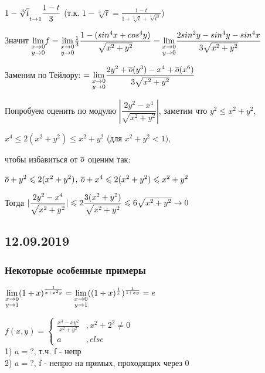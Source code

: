 \documentclass[12pt, fleqn]{article}
\begin{document}
\begin{sol}
    $1-\sqrt[3]{t} \underset{t \rightarrow 1}{~} \dfrac{1-t}{3}$ (т.к. $1-\sqrt[3]{t}=\frac{1-t}{1+\sqrt[5]{t}+\sqrt[3]{t^2}}$)
    
    Значит $\underset{y \rightarrow 0}{\lim\limits_{x \rightarrow 0}} f = \underset{y \rightarrow 0}{\lim\limits_{x \rightarrow 0}} \frac{1}{3} \dfrac{1-(sin^4 x + cos^4 y)}{\sqrt{x^2+y^2}} = \underset{y \rightarrow 0}{\lim\limits_{x \rightarrow 0}} \dfrac{2sin^2 y - sin^4 y - sin^4 x}{3 \sqrt{x^2+y^2}}$
    
    Заменим по Тейлору: $=\underset{y \rightarrow 0}{\lim\limits_{x \rightarrow 0}} \dfrac{2y^2 + \overline{o}(y^3)-x^4 + \overline{o}(x^6)}{3 \sqrt{x^2+y^2}}$
    
    Попробуем оценить по модулю $|\dfrac{2y^2-x^4}{\sqrt{x^2+y^2}}|$, заметим что $y^2 \leqslant x^2 + y^2$, 
    
    $x^4 \leqslant 2(x^2+y^2) \leqslant x^2+y^2$ (для $x^2+y^2 < 1)$, 
    
    чтобы избавиться от $\overline{o}$ оценим так: 
    
    $\overline{o} + y^2 \leqslant 2(x^2 + y^2)$, $\overline{o} + x^4 \leqslant 2(x^2+y^2) \leqslant x^2+y^2$
    
    Тогда $|\dfrac{2y^2-x^4}{\sqrt{x^2+y^2}}| \leqslant 2 \dfrac{3(x^2+y^2)}{\sqrt{x^2+y^2}} \leqslant 6 \sqrt{x^2+y^2} \rightarrow 0$
\end{sol}

\newpage
\subsection{12.09.2019}
\subsubsection{Некоторые особенные примеры}
\begin{example}
    $\underset{y \rightarrow 1}{\lim\limits_{x \rightarrow 0}} (1+x)^{\frac{1}{x+x^2 y}}=\underset{y \rightarrow 1}{\lim\limits_{x \rightarrow 0}} ((1+x)^{\frac{1}{x}})^{\frac{1}{1+x y}}=e$
\end{example}

\begin{example}
    $f(x,y)=\begin{cases} \frac{x^3-xy^2}{x^2+y^2} &,x^2+2^2 \neq 0\\ a & , else \end{cases}$\\
    1) $a=?$, т.ч. f - непр\\
    2) $a=?$, f - непрю на прямых, проходящих через 0\\
\end{example}
\end{document}
